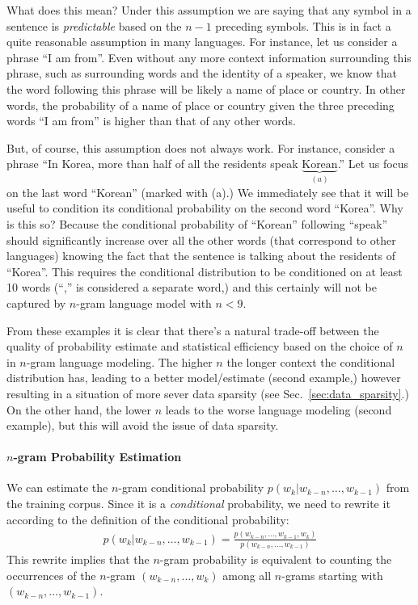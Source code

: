 \documentclass{report}
\begin{document}
What does this mean? Under this assumption we are saying that any symbol in a
sentence is {\em predictable} based on the $n-1$ preceding symbols. This is in
fact a quite reasonable assumption in many languages. For instance, let us
consider a phrase ``I am from''. Even without any more context information
surrounding this phrase, such as surrounding words and the identity of a
speaker, we know that the word following this phrase will be likely a name of
place or country. In other words, the probability of a name of place or country
given the three preceding words ``I am from'' is higher than that of any other
words. 

But, of course, this assumption does not always work. For instance, consider a
phrase ``In Korea, more than half of all the residents speak
$\underbrace{\text{Korean}}_{(a)}$.'' Let us focus on the last word ``Korean''
(marked with (a).) We immediately see that it will be useful to condition its
conditional probability on the second word ``Korea''. Why is this so? Because
the conditional probability of ``Korean'' following ``speak'' should
significantly increase over all the other words (that correspond to other
languages) knowing the fact that the sentence is talking about the residents of
``Korea''. This requires the conditional distribution to be conditioned on at
least 10 words (``,'' is considered a separate word,) and this certainly will
not be captured by $n$-gram language model with $n < 9$.  

From these examples it is clear that there's a natural trade-off between the
quality of probability estimate and statistical efficiency based on the choice
of $n$ in $n$-gram language modeling. The higher $n$ the longer context the
conditional distribution has, leading to a better model/estimate (second
example,) however resulting in a situation of more sever data sparsity (see
Sec.~\ref{sec:data_sparsity}.) On the other hand, the lower $n$ leads to the
worse language modeling (second example), but this will avoid the issue of data
sparsity. 

\paragraph{$n$-gram Probability Estimation}

We can estimate the $n$-gram conditional probability $p(w_k | w_{k-n}, \ldots,
w_{k-1})$ from the training corpus.
Since it is a
{\em conditional} probability, we need to rewrite it according to the definition
of the conditional probability:
\begin{align}
    \label{eq:n_gram_prob}
    p(w_k | w_{k-n}, \ldots, w_{k-1}) = \frac{p(
    w_{k-n}, \ldots, w_{k-1}, w_k)}
    {p(w_{k-n}, \ldots, w_{k-1})}
\end{align}
This rewrite implies that the $n$-gram probability is equivalent to counting
the occurrences of the $n$-gram $(w_{k-n}, \ldots, w_{k})$
among all $n$-grams starting with $(w_{k-n}, \ldots, w_{k-1})$.
\end{document}
